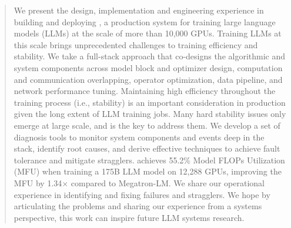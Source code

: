 \begin{abstract}

We present the design, implementation and engineering experience in building and
deploying \sysname, a production system for training large language models
(LLMs) at the scale of more than 10,000 GPUs. Training LLMs at this scale brings
unprecedented challenges to training efficiency and stability. We take a
full-stack approach that co-designs the algorithmic and system components across
model block and optimizer design, computation and
communication overlapping, operator optimization, data pipeline, and network performance tuning.
Maintaining high efficiency throughout the training process (i.e.,
stability) is an important consideration in production given the long extent of
LLM training jobs. Many hard stability issues only emerge at large scale, and
 is the key to address them. We develop a set of diagnosis
tools to monitor system components and events deep in the stack, identify root
causes, and derive effective techniques to achieve fault tolerance and mitigate
stragglers. \sysname achieves 55.2\% Model FLOPs Utilization (MFU) when training
a 175B LLM model on 12,288 GPUs, improving the MFU by 1.34$\times$ compared to
Megatron-LM. We share our operational experience in identifying and fixing
failures and stragglers. We hope by articulating the problems and sharing our
experience from a systems perspective, this work can inspire future LLM systems
research.

\end{abstract}
